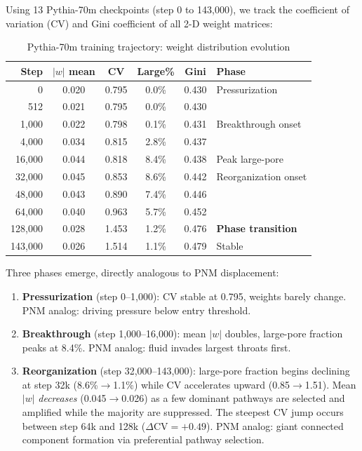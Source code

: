 \documentclass[11pt,a4paper]{article}
\begin{document}
Using 13 Pythia-70m checkpoints (step 0 to 143,000), we track the
coefficient of variation (CV) and Gini coefficient of all 2-D weight
matrices:

\begin{table}[H]
\centering
\caption{Pythia-70m training trajectory: weight distribution evolution}
\label{tab:pythia-trajectory}
\small
\begin{tabular}{rccccl}
\toprule
\textbf{Step} & $|w|$ \textbf{mean} & \textbf{CV} & \textbf{Large\%} & \textbf{Gini} & \textbf{Phase} \\
\midrule
0      & 0.020 & 0.795 & 0.0\% & 0.430 & Pressurization \\
512    & 0.021 & 0.795 & 0.0\% & 0.430 & \\
1,000  & 0.022 & 0.798 & 0.1\% & 0.431 & Breakthrough onset \\
4,000  & 0.034 & 0.815 & 2.8\% & 0.437 & \\
16,000 & 0.044 & 0.818 & 8.4\% & 0.438 & Peak large-pore \\
32,000 & 0.045 & 0.853 & 8.6\% & 0.442 & Reorganization onset \\
48,000 & 0.043 & 0.890 & 7.4\% & 0.446 & \\
64,000 & 0.040 & 0.963 & 5.7\% & 0.452 & \\
128,000& 0.028 & 1.453 & 1.2\% & 0.476 & \textbf{Phase transition} \\
143,000& 0.026 & 1.514 & 1.1\% & 0.479 & Stable \\
\bottomrule
\end{tabular}
\end{table}

Three phases emerge, directly analogous to PNM displacement:

\begin{enumerate}[nosep]
\item \textbf{Pressurization} (step 0--1,000): CV stable at 0.795, weights
  barely change. PNM analog: driving pressure below entry threshold.
\item \textbf{Breakthrough} (step 1,000--16,000): mean $|w|$ doubles, large-pore
  fraction peaks at 8.4\%. PNM analog: fluid invades largest throats first.
\item \textbf{Reorganization} (step 32,000--143,000): large-pore fraction begins
  declining at step 32k (8.6\%$\to$1.1\%) while CV accelerates upward
  (0.85$\to$1.51). Mean $|w|$ \emph{decreases} (0.045$\to$0.026) as
  a few dominant pathways are selected and amplified while the majority are
  suppressed. The steepest CV jump occurs between step 64k and 128k
  ($\Delta$CV$=+0.49$). PNM analog: giant connected component formation
  via preferential pathway selection.
\end{enumerate}
\end{document}
